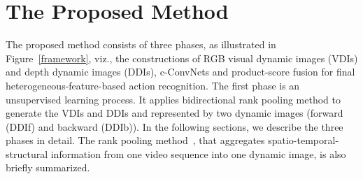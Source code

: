 \documentclass[letterpaper]{article} %
\begin{document}



\section{The Proposed Method}\label{hConvNets}
The proposed method consists of three phases, as illustrated in Figure~\ref{framework}, viz., the constructions of RGB visual dynamic images (VDIs) and depth dynamic images (DDIs), c-ConvNets and product-score fusion for final heterogeneous-feature-based action recognition. The first phase is an unsupervised learning process. It applies bidirectional rank pooling method to generate the VDIs and DDIs and represented by two dynamic images (forward (DDIf) and backward (DDIb)). In the following sections, we describe the three phases in detail. The rank pooling method~\cite{bilen2016dynamic}, that aggregates spatio-temporal-structural information from one video sequence into one dynamic image, is also briefly summarized.
\end{document}
